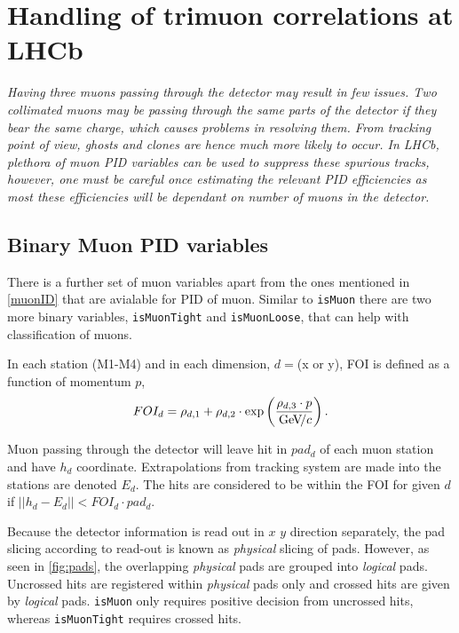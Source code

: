 \chapter{Handling of trimuon correlations at LHCb}
\label{chap:trimuon}

\textit{Having three muons passing through the detector may result in few issues. Two collimated muons may be passing through the same parts of the detector if they bear the same charge, which causes problems in resolving them. From tracking point of view, ghosts and clones are hence much more likely to occur. In LHCb, plethora of muon \Gls{PID} variables can be used to suppress these spurious tracks, however, one must be careful once estimating the relevant \gls{PID} efficiencies as most these efficiencies will be dependant on number of muons in the detector.}

\section{Binary Muon PID variables}
There is a further set of muon variables apart from the ones mentioned in \autoref{muonID} that are avialable for \gls{PID} of muon. Similar to \texttt{isMuon} there are two more binary variables, \texttt{isMuonTight} and \texttt{isMuonLoose}, that can help with classification of muons. 

In each station (M1-M4) and in each dimension, $d=$(x or y), \gls{FOI} is defined as a function of momentum $p$,
\begin{equation}
	FOI_{d}=\rho_{d,1}+\rho_{d,2}\cdot \exp \left(\frac{\rho_{d,3}\cdot p}{{\mathrm{\,Ge\kern -0.1em V\!/}c}} \right).
\end{equation}

Muon passing through the detector will leave hit in $pad_{d}$ of each muon station and have $h_{d}$ coordinate. Extrapolations from tracking system are made into the stations are denoted $E_{d}$. The hits are considered to be within the \gls{FOI} for given $d$ if $|| h_{d} - E_{d} || < FOI_{d} \cdot pad_{d}$. 

Because the detector information is read out in $x$ $y$ direction separately, the pad slicing according to read-out is known as \textit{physical} slicing of pads. However, as seen in \autoref{fig:pads}, the overlapping \textit{physical} pads are grouped into \textit{logical} pads. Uncrossed hits are registered within \textit{physical} pads only and crossed hits are given by \textit{logical} pads. \texttt{isMuon} only requires positive decision from uncrossed hits, whereas \texttt{isMuonTight} requires crossed hits. 


